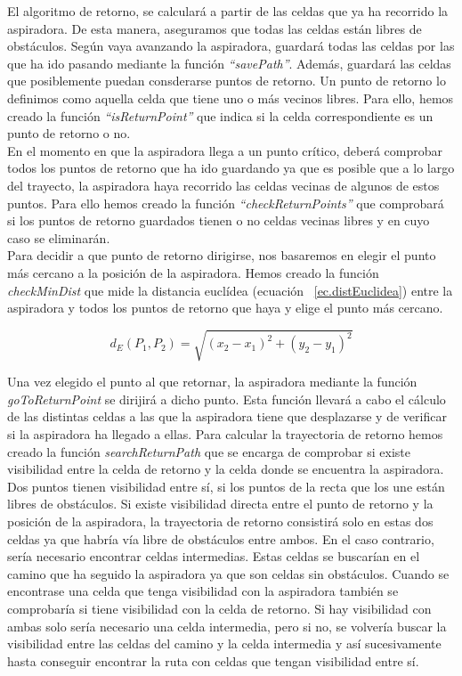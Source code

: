 El algoritmo de retorno, se calculará a partir de las celdas que ya ha recorrido la aspiradora. De esta manera, aseguramos que todas las celdas están libres de obstáculos. Según vaya avanzando la aspiradora, guardará todas las celdas por las que ha ido pasando mediante la función \textit{``savePath''}. Además, guardará las celdas que posiblemente puedan consderarse puntos de retorno. Un punto de retorno lo definimos como aquella celda que tiene uno o más vecinos libres. Para ello, hemos creado la función \textit{``isReturnPoint''} que indica si la celda correspondiente es un punto de retorno o no.\\

En el momento en que la aspiradora llega a un punto crítico, deberá comprobar todos los puntos de retorno que ha ido guardando ya que es posible que a lo largo del trayecto, la aspiradora haya recorrido las celdas vecinas de algunos de estos puntos. Para ello hemos creado la función \textit{``checkReturnPoints''} que comprobará si los puntos de retorno guardados tienen o no celdas vecinas libres y en cuyo caso se eliminarán. \\

Para decidir a que punto de retorno dirigirse, nos basaremos en elegir el punto más cercano a la posición de la aspiradora. Hemos creado la función \textit{checkMinDist} que mide la distancia euclídea (ecuación ~\ref{ec.distEuclidea}) entre la aspiradora y todos los puntos de retorno que haya y elige el punto más cercano.

\begin{equation}
\label{ec.distEuclidea}
d_{E}(P_{1}, P_{2}) = \sqrt{(x_{2} - x_{1})^{2} + (y_{2} - y_{1})^{2}}
\end{equation}

Una vez elegido el punto al que retornar, la aspiradora mediante la función \textit{goToReturnPoint} se dirijirá a dicho punto. Esta función llevará a cabo el cálculo de las distintas celdas a las que la aspiradora tiene que desplazarse y de verificar si la aspiradora ha llegado a ellas. Para calcular la trayectoria de retorno hemos creado la función \textit{searchReturnPath} que se encarga de comprobar si existe visibilidad entre la celda de retorno y la celda donde se encuentra la aspiradora. Dos puntos tienen visibilidad entre sí, si los puntos de la recta que los une están libres de obstáculos. Si existe visibilidad directa entre el punto de retorno y la posición de la aspiradora, la trayectoria de retorno consistirá solo en estas dos celdas ya que habría vía libre de obstáculos entre ambos. En el caso contrario, sería necesario encontrar celdas intermedias. Estas celdas se buscarían en el camino que ha seguido la aspiradora ya que son celdas sin obstáculos. Cuando se encontrase una celda que tenga visibilidad con la aspiradora también se comprobaría si tiene visibilidad con la celda de retorno. Si hay visibilidad con ambas solo sería necesario una celda intermedia, pero si no, se volvería buscar la visibilidad entre las celdas del camino y la celda intermedia y así sucesivamente hasta conseguir encontrar la ruta con celdas que tengan visibilidad entre sí.\\

